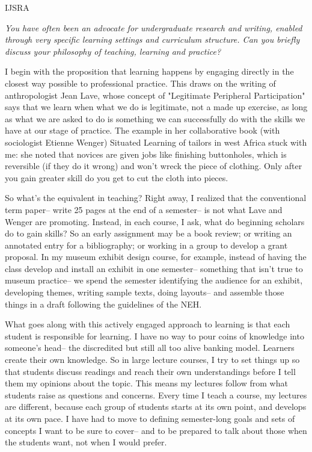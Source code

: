 \begin{labeling}{IJSRA}
	\item[IJSRA (International Journal of Student Research in Archaeology)] \textit{You have often been an advocate for undergraduate research and writing, enabled through very specific learning settings and curriculum structure.  Can you briefly discuss your philosophy of teaching, learning and practice?}
	
	\item[RAJ (Dr. Rosemary A Joyce)] I begin with the proposition that learning happens by engaging directly in the closest way possible to professional practice. This draws on the writing of anthropologist Jean Lave, whose concept of "Legitimate Peripheral Participation" says that we learn when what we do is legitimate, not a made up exercise, as long as what we are asked to do is something we can successfully do with the skills we have at our stage of practice. The example in her collaborative book (with sociologist Etienne Wenger) Situated Learning of tailors in west Africa stuck with me: she noted that novices are given jobs like finishing buttonholes, which is reversible (if they do it wrong) and won't wreck the piece of clothing. Only after you gain greater skill do you get to cut the cloth into pieces. 
	
	So what's the equivalent in teaching? Right away, I realized that the conventional term paper-- write 25 pages at the end of a semester-- is not what Lave and Wenger are promoting. Instead, in each course, I ask, what do beginning scholars do to gain skills? So an early assignment may be a book review; or writing an annotated entry for a bibliography; or working in a group to develop a grant proposal. In my museum exhibit design course, for example, instead of having the class develop and install an exhibit in one semester-- something that isn't true to museum practice-- we spend the semester identifying the audience for an exhibit, developing themes, writing sample texts, doing layouts-- and assemble those things in a draft following the guidelines of the NEH.
	
	What goes along with this actively engaged approach to learning is that each student is responsible for learning. I have no way to pour coins of knowledge into someone's head-- the discredited but still all too alive banking model. Learners create their own knowledge. So in large lecture courses, I try to set things up so that students discuss readings and reach their own understandings before I tell them my opinions about the topic. This means my lectures follow from what students raise as questions and concerns. Every time I teach a course, my lectures are different, because each group of students starts at its own point, and develops at its own pace. I have had to move to defining semester-long goals and sets of concepts I want to be sure to cover-- and to be prepared to talk about those when the students want, not when I would prefer.


\end{labeling}
